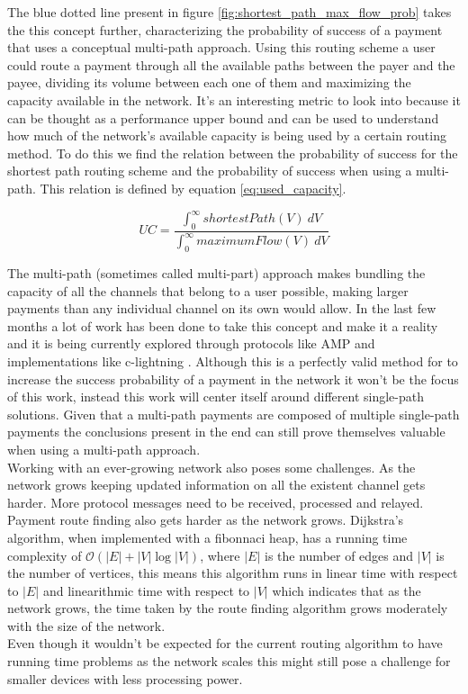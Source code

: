 The blue dotted line present in figure \ref{fig:shortest_path_max_flow_prob} takes the this concept further, characterizing the probability of success of a payment that uses a conceptual multi-path approach. Using this routing scheme a user could route a payment through all the available paths between the payer and the payee, dividing its volume between each one of them and maximizing the capacity available in the network. It's an interesting metric to look into because it can be thought as a performance upper bound and can be used to understand how much of the network's available capacity is being used by a certain routing method. To do this we find the relation between the probability of success for the shortest path routing scheme and the probability of success when using a multi-path. This relation is defined by equation \ref{eq:used_capacity}.

\begin{equation}
UC = \frac{\int_{0}^{\infty} shortestPath(V)~dV}{\int_{0}^{\infty} maximumFlow(V)~dV}
\label{eq:used_capacity}
\end{equation}

The multi-path (sometimes called multi-part) approach makes bundling the capacity of all the channels that belong to a user possible, making larger payments than any individual channel on its own would allow. In the last few months a lot of work has been done to take this concept and make it a reality and it is being currently explored through protocols like AMP \cite{amp} and implementations like c-lightning \cite{c-lightning_0.8}. Although this is a perfectly valid method for to increase the success probability of a payment in the network it won't be the focus of this work, instead this work will center itself around different single-path solutions. Given that a multi-path payments are composed of multiple single-path payments the conclusions present in the end can still prove themselves valuable when using a multi-path approach.\\
Working with an ever-growing network also poses some challenges. As the network grows keeping updated information on all the existent channel gets harder. More protocol messages need to be received, processed and relayed. Payment route finding also gets harder as the network grows. Dijkstra's algorithm, when implemented with a fibonnaci heap, has a running time complexity of $\mathcal{O}(|E| + |V|\log{}|V|)$, where $|E|$ is the number of edges and $|V|$ is the number of vertices, this means this algorithm runs in linear time with respect to $|E|$ and linearithmic time with respect to $|V|$ which indicates that as the network grows, the time taken by the route finding algorithm grows moderately with the size of the network. \\
Even though it wouldn't be expected for the current routing algorithm to have running time problems as the network scales this might still pose a challenge for smaller devices with less processing power. \\

